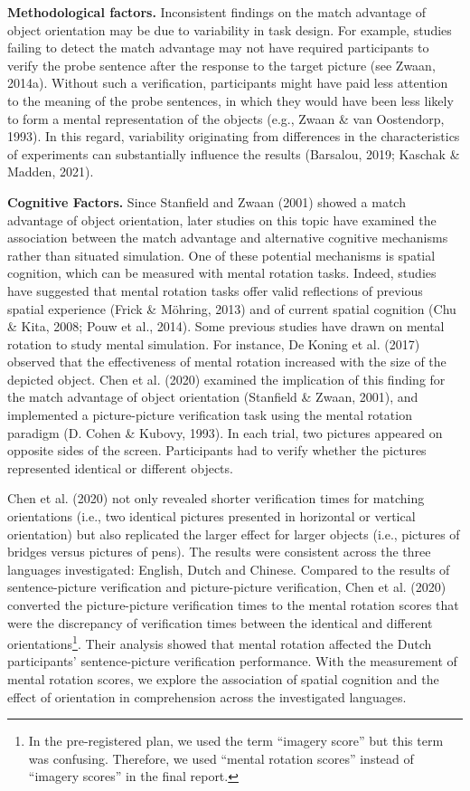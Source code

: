 \documentclass[
  man,floatsintext]{apa7}
\begin{document}
\textbf{Methodological factors.} Inconsistent findings on the match advantage
of object orientation may be due to variability in task design. For
example, studies failing to detect the match advantage may not have
required participants to verify the probe sentence after the response to
the target picture (see Zwaan, 2014a). Without such a
verification, participants might have paid less attention to the meaning
of the probe sentences, in which they would have been less likely to
form a mental representation of the objects (e.g., Zwaan \& van Oostendorp, 1993). In this regard, variability
originating from differences in the characteristics of experiments can
substantially influence the results
(Barsalou, 2019; Kaschak \& Madden, 2021).

\textbf{Cognitive Factors.} Since Stanfield and Zwaan (2001) showed a match
advantage of object orientation, later studies on this topic have
examined the association between the match advantage and alternative
cognitive mechanisms rather than situated simulation. One of these
potential mechanisms is spatial cognition, which can be measured with
mental rotation tasks. Indeed, studies have suggested that mental
rotation tasks offer valid reflections of previous spatial experience
(Frick \& Möhring, 2013) and of current spatial cognition
(Chu \& Kita, 2008; Pouw et al., 2014). Some
previous studies have drawn on mental rotation to study mental
simulation. For instance, De Koning et al. (2017) observed that the
effectiveness of mental rotation increased with the size of the depicted
object. Chen et al. (2020) examined the implication of this finding
for the match advantage of object orientation (Stanfield \& Zwaan, 2001),
and implemented a picture-picture verification task using the mental
rotation paradigm (D. Cohen \& Kubovy, 1993). In each trial, two
pictures appeared on opposite sides of the screen. Participants had to
verify whether the pictures represented identical or different objects.

Chen et al. (2020) not only revealed shorter verification times for matching
orientations (i.e., two identical pictures presented in horizontal or
vertical orientation) but also replicated the larger effect for larger
objects (i.e., pictures of bridges versus pictures of pens). The results
were consistent across the three languages investigated: English, Dutch
and Chinese. Compared to the results of sentence-picture verification
and picture-picture verification, Chen et al. (2020) converted the
picture-picture verification times to the mental rotation scores that
were the discrepancy of verification times between the identical and
different orientations\footnote{In the pre-registered plan, we used the term ``imagery score'' but
  this term was confusing. Therefore, we used ``mental rotation scores''
  instead of ``imagery scores'' in the final report.}. Their analysis showed that mental rotation
affected the Dutch participants' sentence-picture verification
performance. With the measurement of mental rotation scores, we explore
the association of spatial cognition and the effect of orientation in
comprehension across the investigated languages.
\end{document}
